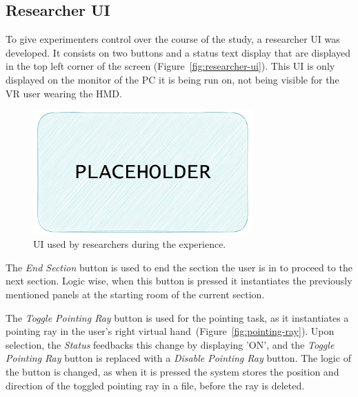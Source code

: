 \subsection{Researcher UI}
\label{sec:gui}

To give experimenters control over the course of the study, a researcher \gls{UI} was developed. 
It consists on two buttons and a status text display that are displayed in the top left corner of the screen (Figure~\ref{fig:researcher-ui}).
This \gls{UI} is only displayed on the monitor of the \gls{PC} it is being run on, not being visible for the \gls{VR} user wearing the \gls{HMD}.

\begin{figure}[b]
    \centering
     \includegraphics[width=0.75\textwidth]{NOVAthesisFiles/Images/placeholder.pdf}
     \caption[UI used by researchers during the experience.]
     {UI used by researchers during the experience.}
     \label{fig:likert-scale-ui}
\end{figure}

The \textit{End Section} button is used to end the section the user is in to proceed to the next section. Logic wise, when this button is pressed 
it instantiates the previously mentioned panels at the starting room of the current section. 

The \textit{Toggle Pointing Ray} button is used for the pointing task, as it instantiates a pointing ray in the user's right virtual 
hand~(Figure~\ref{fig:pointing-ray}). Upon selection, the \textit{Status} feedbacks this change by displaying 'ON', and the \textit{Toggle Pointing 
Ray} button is replaced with a \textit{Disable Pointing Ray} button. The logic of the button is changed, 
as when it is pressed the system stores the position and direction of the toggled pointing ray in a file, before the ray is deleted.

